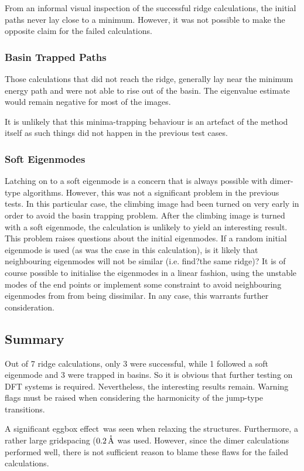 From an informal visual inspection of the successful ridge calculations, the initial paths never lay close to a minimum.
However, it was not possible to make the opposite claim for the failed calculations.

\subsubsection{Basin Trapped Paths}
Those calculations that did not reach the ridge, generally lay near the minimum energy path and were not able to rise out of the basin.
The eigenvalue estimate would remain negative for most of the images.

It is unlikely that this minima-trapping behaviour is an artefact of the method itself as such things did not happen in the previous test cases.

\subsubsection{Soft Eigenmodes}
Latching on to a soft eigenmode is a concern that is always possible with dimer-type algorithms.
However, this was not a significant problem in the previous tests.
In this particular case, the climbing image had been turned on very early in order to avoid the basin trapping problem.
After the climbing image is turned with a soft eigenmode, the calculation is unlikely to yield an interesting result.
This problem raises questions about the initial eigenmodes.
If a random initial eigenmode is used (as was the case in this calculation), is it likely that neighbouring eigenmodes will not be similar (i.e. find?the same ridge)?
It is of course possible to initialise the eigenmodes in a linear fashion, using the unstable modes of the end points or implement some constraint to avoid neighbouring eigenmodes from from being dissimilar.
In any case, this warrants further consideration.

\subsection{Summary}
Out of 7 ridge calculations, only 3 were successful, while 1 followed a soft eigenmode and 3 were trapped in basins.
So it is obvious that further testing on DFT systems is required.
Nevertheless, the interesting results remain.
Warning flags must be raised when considering the harmonicity of the jump-type transitions.

A significant eggbox effect~\citemiss was seen when relaxing the structures.
Furthermore, a rather large gridspacing ($0.2 \, \mathrm{\mathring{\mathrm{A}}}$ was used.
However, since the dimer calculations performed well, there is not sufficient reason to blame these flaws for the failed calculations.

